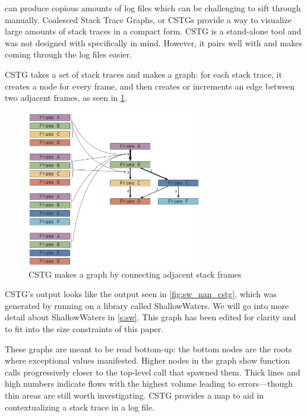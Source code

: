 \documentclass{juliacon}
\begin{document}
\FT{} can produce copious amounts of log files which can be challenging to sift through manually.
Coalesced Stack Trace Graphs, or CSTGs\cite{humphreySystematicDebuggingMethods2014} provide a way to visualize large amounts of stack traces in a compact form.
CSTG is a stand-alone tool and was not designed with \FT{} specifically in mind.
However, it pairs well with \FT{} and makes coming through the log files easier.

CSTG takes a set of stack traces and makes a graph: for each stack trace, it creates a node for every frame, and then creates or increments an edge between two adjacent frames, as seen in \cref{fig:cstg_demo}.

\begin{figure}
  \centering
  \includegraphics[width=3in]{./fig/cstg_static_diagram.png}
  \caption{CSTG makes a graph by connecting adjacent stack frames}
  \label{fig:cstg_demo}
\end{figure}

CSTG's output looks like the output seen in \cref{fig:sw_nan_cstg}, which was generated by running \FT{} on a library called ShallowWaters.
We will go into more detail about ShallowWaters in \cref{s:sw}.
This graph has been edited for clarity and to fit into the size constraints of this paper.

These graphs are meant to be read bottom-up: the bottom nodes are the roots where exceptional values manifested.
Higher nodes in the graph show function calls progressively closer to the top-level call that spawned them.
Thick lines and high numbers indicate flows with the highest volume leading to errors---though thin areas are still worth investigating.
CSTG provides a map to aid in contextualizing a stack trace in a log file.

\subsection{\GPUFPX{}}
\label{s:gpufpx}
\end{document}
